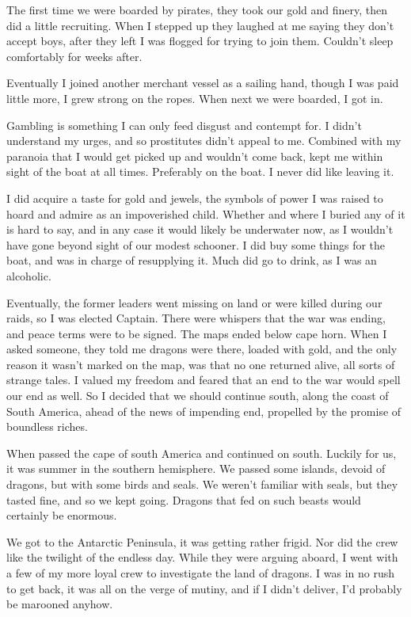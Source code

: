The first time we were boarded by pirates, they took our gold and finery, then did a little recruiting. When I stepped up they laughed at me saying they don’t accept boys, after they left I was flogged for trying to join them.  Couldn’t sleep comfortably for weeks after.

Eventually I joined another merchant vessel as a sailing hand, though I was paid little more, I grew strong on the ropes.  When next we were boarded, I got in.

Gambling is something I can only feed disgust and contempt for. I didn’t
understand my urges, and so prostitutes didn’t appeal to me. 
Combined with my paranoia that I would get picked up and wouldn’t come back, 
kept me within sight of the boat at all times. Preferably on the boat.  
I never did like leaving it.

I did acquire a taste for gold and jewels, the symbols of power I was raised to hoard and admire as an impoverished child. Whether and where I buried any of it is hard to say, and in any case it would likely be underwater now, as I wouldn’t have gone beyond sight of our modest schooner.  I did buy some things for the boat, and was in charge of resupplying it.  Much did go to drink, as I was an alcoholic.

Eventually, the former leaders went missing on land or were killed during our raids, so I was elected Captain.  There were whispers that the war was ending, and peace terms were to be signed. The maps ended below cape horn. When I asked someone, they told me dragons were there, loaded with gold, and the only reason it wasn’t marked on the map, was that no one returned alive, all sorts of strange tales.  I valued my freedom and feared that an end to the war would spell our end as well. So I decided that we should continue south, along the coast of South America, ahead of the news of impending end, propelled by the promise of boundless riches.

When passed the cape of south America and continued on south. Luckily for us, it was summer in the southern hemisphere. We passed some islands, devoid of dragons, but with some birds and seals.  We weren’t familiar with seals, but they tasted fine, and so we kept going.   Dragons that fed on such beasts would certainly be enormous.

We got to the Antarctic Peninsula, it was getting rather frigid. Nor did the crew like the twilight of the endless day.  While they were arguing aboard, I went with a few of my more loyal crew to investigate the land of dragons.  I was in no rush to get back, it was all on the verge of mutiny, and if I didn’t deliver, I’d probably be marooned anyhow.


